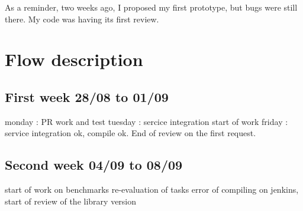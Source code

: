 \documentclass[12pt]{article}
\begin{document}
As a reminder, two weeks ago, I proposed my first prototype, but 
bugs were still there. My code was having its first review.

\section{Flow description}
\subsection{First week 28/08 to 01/09}
monday : PR work and test
tuesday : sercice integration start of work
friday : service integration ok, compile ok.
End of review on the first request.

\subsection{Second week 04/09 to 08/09}
start of work on benchmarks 
re-evaluation of tasks
error of compiling on jenkins, start of review of the library version
\end{document}
